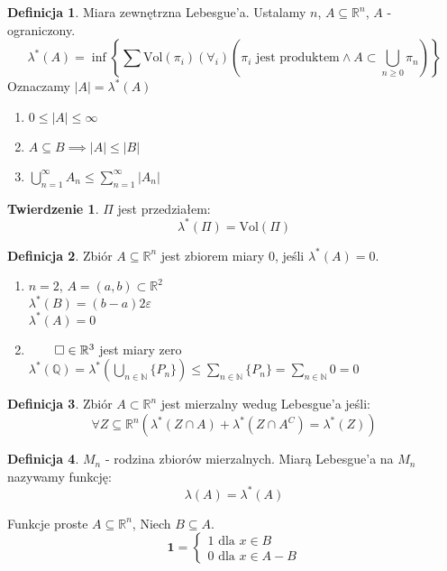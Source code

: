 \documentclass{article}
\theoremstyle{definition}
\newtheorem{de}{Definicja}[subsection]
\theoremstyle{definition}
\newtheorem{tw}{Twierdzenie}[subsection]
\theoremstyle{definition}
\theoremstyle{definition}
\begin{document}
\begin{de}
    Miara zewnętrzna Lebesgue'a. Ustalamy $n$, $A\subseteq \mathbb{R}^n$, $A$ - ograniczony.
    \[\lambda^{*}(A) = \inf \left\{\sum \text{Vol}(\pi_i) \left(\forall_i \right)(\pi_i \text{ jest produktem} \land A\subset \bigcup_{n\geq 0} \pi_n)\right\}\]
    Oznaczamy $|A|=\lambda^{*}(A)$
\end{de}

\begin{enumerate}
    \item $0 \leq |A| \leq \infty$
    \item $A\subseteq B \implies |A| \leq |B|$
    \item $\bigcup_{n=1}^{\infty} A_n \leq \sum_{n=1}^{\infty} |A_n|$
\end{enumerate}

\begin{tw}
    $\Pi$ jest przedziałem:
    \[\lambda^{*}(\Pi) = \text{Vol}(\Pi)\]
\end{tw}

\begin{de}
    Zbiór $A\subseteq \mathbb{R}^n$ jest zbiorem miary 0, jeśli $\lambda^{*}(A)=0$.
    \begin{enumerate}
        \item $n=2$, $A = (a,b) \subset \mathbb{R}^2$\\
        $\lambda^{*}(B)=(b-a)2\varepsilon$\\
        $\lambda^{*}(A)=0$
        \item $\qed\in \mathbb{R}^3$ jest miary zero\\
        $\lambda^{*}(\mathbb{Q})=\lambda^{*}(\bigcup_{n\in\mathbb{N}} \{P_n\}) \leq \sum_{n\in\mathbb{N}} \{P_n\} = \sum_{n\in\mathbb{N}} 0 = 0$
    \end{enumerate}
\end{de}

\begin{de}
    Zbiór $A\subset \mathbb{R}^n$ jest mierzalny wedug Lebesgue'a jeśli:
    \[\forall Z\subseteq \mathbb{R}^n \left(\lambda^{*}(Z\cap A) + \lambda^{*}(Z\cap A^C) = \lambda^{*}(Z)\right)\]
\end{de}

\begin{de}
    $M_n$ - rodzina zbiorów mierzalnych. Miarą Lebesgue'a na $M_n$ nazywamy funkcję:
    \[\lambda(A) = \lambda^{*}(A)\]
\end{de}
Funkcje proste $A\subseteq \mathbb{R}^n$, Niech $B\subseteq A$.
\[
\textbf{1} =
\begin{cases}
    1 \text{ dla } x\in B\\
    0 \text{ dla } x\in A-B
\end{cases}
\]
\end{document}
